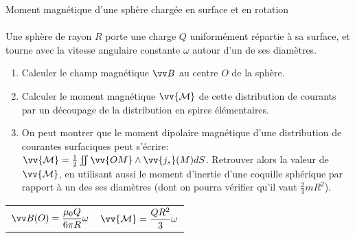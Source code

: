 \documentclass[french, a4paper, 11pt]{article}
\newcommand{\uz}{\vv{u_z}}          %
\begin{document}
\begin{cadre}{Moment magnétique d'une sphère chargée en surface et en rotation}
  \paragraph*{}

  Une sphère de rayon \(R\) porte une charge \(Q\) uniformément répartie à sa surface, et tourne avec la vitesse angulaire constante \(\omega\) autour d'un de ses diamètres.
  \begin{enumerate}[label=\upshape\alph*)]
    \item Calculer le champ magnétique \(\vv B\) au centre \(O\) de la sphère.
    \item Calculer le moment magnétique \(\vv{\mathcal M}\) de cette distribution de courants par un découpage de la distribution en spires élémentaires.
    \item On peut montrer que le moment dipolaire magnétique d'une distribution de courantes surfaciques peut s'écrire: \(\vv{\mathcal M} = \frac{1}{2}\iint\vv{OM}\wedge \vv{j_{s}}(M)dS\). Retrouver alors la valeur de \(\vv{\mathcal M}\), en utilisant aussi le moment d'inertie d'une coquille sphérique par rapport à un des ses diamètres (dont on pourra vérifier qu'il vaut \(\frac{2}{3}mR^{2}\)).
  \end{enumerate}
  \tcblower
  \begin{tabularx}{\linewidth}{Xr}
    \(\vv B(O) = \dfrac{\mu_{0}Q}{6\pi R}\omega\) & \(\vv{\mathcal M} = \dfrac{QR^{2}}{3}\omega\)
  \end{tabularx}
\end{cadre}
\end{document}
